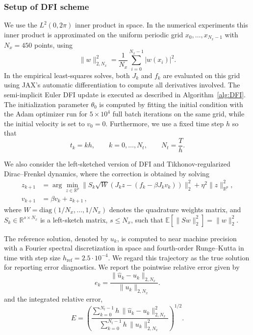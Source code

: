 \documentclass[oneside,11pt]{article}
\theoremstyle{remark}
\theoremstyle{thmstyleone}
\theoremstyle{thmstylethree}
\theoremstyle{thmstyletwo}
\newcommand{\R}{\mathbb{R}}
\newcommand{\abs}[1]{\lvert #1\rvert}
\newcommand{\norm}[1]{\lVert #1\rVert}
\begin{document}
\subsubsection{Setup of DFI scheme}
We use the $L^2(0,2\pi)$ inner product in space. In the numerical experiments this inner product is approximated on the uniform periodic grid $x_0, \dots, x_{N_x - 1}$ with $N_x = 450$ points, using
\begin{equation*}
    \norm{w}_{2,N_x}^2
    =
    \frac{1}{N_x}
    \sum_{i=0}^{N_x-1}\abs{w(x_i)}^2.
\end{equation*}
In the empirical least-squares solves, both $J_k$ and $f_k$ are evaluated on this grid using JAX's automatic differentiation to compute all derivatives involved. The semi-implicit Euler DFI update is executed as described in Algorithm~\ref{alg:DFI}.
The initialization parameter $\theta_0$ is computed by fitting the initial condition with the Adam optimizer run for $5 \times 10^4$ full batch iterations on the same grid, while the initial velocity is set to $v_0=0$. Furthermore, we use a fixed time step $h$ so that
\[
    t_k=kh,
    \qquad
    k=0,\ldots,N_t,
    \qquad
    N_t=\frac{T}{h}.
\]



We also consider the left-sketched version of DFI and Tikhonov-regularized Dirac--Frenkel dynamics, where the correction is obtained by solving
\begin{align}
    z_{k+1}
     & =
    \arg\min_{z\in \R^p}
    \norm{
        S_k \sqrt{W} \left(J_kz-(f_k-\beta J_kv_k)\right)
    }_2^2
    +
    \eta^2\norm{z}_{\R^p}^2,
    \label{eq:dfi_spat_disc_left_sketch}
    \\
    v_{k+1}
     & =
    \beta v_k+z_{k+1}\,,
\end{align}
where $W=\mathrm{diag}(1/N_x,\dots,1/N_x)$ denotes the quadrature weights matrix, and $S_k\in\R^{s\times N_x}$ is a left-sketch matrix, $s \leq N_x$, such that $\mathbb{E}[\|Sw\|_2^2]= \|w\|_2^2$.

The reference solution, denoted by $u_k$, is computed to near machine precision with a Fourier spectral discretization in space and fourth-order Runge--Kutta in time with step size $h_{\mathrm{ref}}=2.5\cdot 10^{-4}$. We regard this trajectory as the true solution for reporting error diagnostics. We report the pointwise relative error given by
\begin{equation}
    e_k
    =
    \frac{
        \norm{\hat u_k-u_k}_{2,N_x}
    }{
        \norm{u_k}_{2,N_x}
    }.\label{eq:NumExp:PointwiseError}
\end{equation}
and the integrated relative error,
\begin{equation*}
    E
    =
    \left(
    \frac{
        \sum_{k=0}^{N_t-1}h\,
        \norm{\hat u_k-u_k}_{2,N_x}^2
    }{
        \sum_{k=0}^{N_t-1}h\,
        \norm{u_k}_{2,N_x}^2
    }
    \right)^{1/2}.
\end{equation*}
\end{document}
